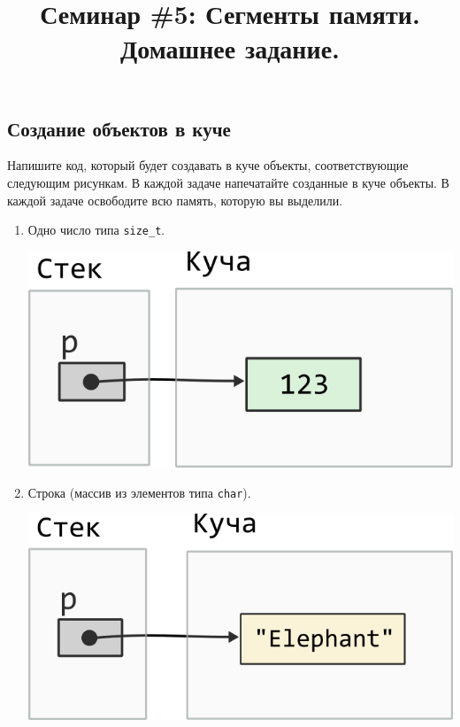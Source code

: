 \documentclass[10pt]{article}
\newcommand{\mallocImagesScale}{0.72}
\begin{document}
\title{Семинар \#5: Сегменты памяти. Домашнее задание.\vspace{-5ex}}\date{}\maketitle
\subsection{Создание объектов в куче}

Напишите код, который будет создавать в куче объекты, соответствующие следующим рисункам. В каждой задаче напечатайте созданные в куче объекты. В каждой задаче освободите всю память, которую вы выделили.
\begin{enumerate}
\item Одно число типа \texttt{size\_t}.
\begin{center}
\includegraphics[scale=\mallocImagesScale]{../images/malloc_homework/00heap_size_t.png}
\end{center}


\item Строка (массив из элементов типа \texttt{char}).
\begin{center}
\includegraphics[scale=\mallocImagesScale]{../images/malloc_homework/01heap_char_array.png}
\end{center}


\end{enumerate}
\end{document}
